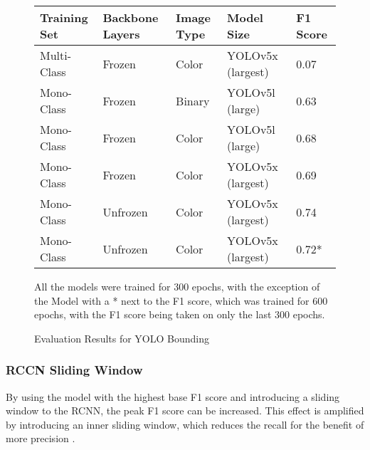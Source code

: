 \begin{figure}[H]
    \caption{Evaluation Results for YOLO Bounding}
    \label{fig:evalYOLORaw}
    \begin{center}
      \begin{tabular}{ | l | l | l | l | l | }
          \hline
          Training Set & Backbone Layers & Image Type & Model Size & F1 Score \\
          \hline
          Multi-Class & Frozen & Color & YOLOv5x (largest) & 0.07 \\
          Mono-Class & Frozen & Binary & YOLOv5l (large) & 0.63 \\
          Mono-Class & Frozen & Color & YOLOv5l (large) & 0.68 \\
          Mono-Class & Frozen & Color & YOLOv5x (largest) & 0.69 \\
          Mono-Class & Unfrozen & Color & YOLOv5x (largest) & 0.74 \\
          Mono-Class & Unfrozen & Color & YOLOv5x (largest) & 0.72* \\
          \hline
      \end{tabular}
    \end{center}
    \vspace{5mm}
    All the models were trained for 300 epochs, with the exception of the Model with a * next to the F1 score, which was trained for 600 epochs, with the F1 score being taken on only the last 300 epochs.
\end{figure}

\subsubsection{RCCN Sliding Window}

By using the model with the highest base F1 score and introducing a sliding window to the RCNN, the peak F1 score can be increased. This effect is amplified by introducing an inner sliding window, which reduces the recall for the benefit of more precision .

